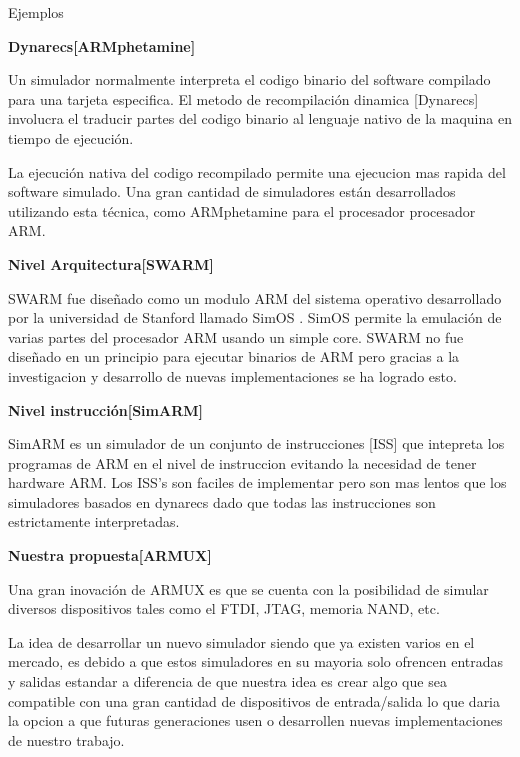 Ejemplos\medskip

{\bf Dynarecs[ARMphetamine]}\medskip

Un simulador normalmente interpreta el codigo binario del software compilado para una tarjeta especifica. El metodo de recompilación dinamica [Dynarecs] \cite{Dynamic} involucra el traducir partes del codigo binario al lenguaje nativo de la maquina en tiempo de ejecución.\medskip

La ejecución nativa del codigo recompilado permite una ejecucion mas rapida del software simulado. Una gran cantidad de simuladores están desarrollados utilizando esta técnica, como ARMphetamine \cite{ARMphetamine} para el procesador procesador ARM.\medskip

{\bf Nivel Arquitectura[SWARM]}\medskip

SWARM \cite{SWARM} fue diseñado como un modulo ARM del sistema operativo desarrollado por la universidad de Stanford llamado SimOS \cite{SimOS}. SimOS permite la emulación de varias partes del procesador ARM usando un simple core. SWARM no fue diseñado en un principio para ejecutar binarios de ARM pero gracias a la investigacion y desarrollo de nuevas implementaciones se ha logrado esto.\medskip

{\bf Nivel instrucción[SimARM]}\medskip

SimARM es un simulador de un conjunto de instrucciones [ISS] que intepreta los programas de ARM en el nivel de instruccion evitando la necesidad de tener hardware ARM. Los ISS's son faciles de implementar pero son mas lentos que los simuladores basados en dynarecs dado que todas las instrucciones son estrictamente interpretadas.\medskip

{\bf Nuestra propuesta[ARMUX]}\medskip

Una gran inovación de ARMUX es que se cuenta con la posibilidad de simular diversos dispositivos tales como el FTDI, JTAG, memoria NAND, etc.\medskip 

La idea de desarrollar un nuevo simulador siendo que ya existen varios en el mercado, es debido a que estos simuladores en su mayoria solo ofrencen entradas y salidas estandar a diferencia de que nuestra idea es crear algo que sea compatible con una gran cantidad de dispositivos de entrada/salida lo que daria la opcion a que futuras generaciones usen o desarrollen nuevas implementaciones de nuestro trabajo.



